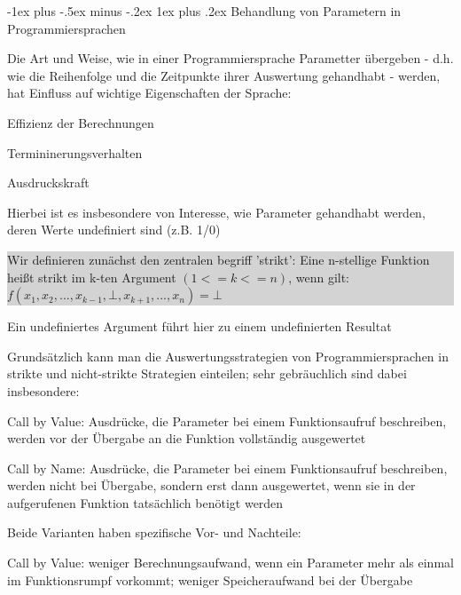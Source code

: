 \documentclass[10pt]{article}
\makeatletter
\renewcommand{\subsubsection}{\@startsection{subsubsection}{3}{0mm}%
                                {-1ex plus -.5ex minus -.2ex}%
                                {1ex plus .2ex}%
                                {\normalfont\small\bfseries}}
\makeatother
\begin{document}
\subsubsection{Behandlung von Parametern in Programmiersprachen}
\begin{itemize*}
  \item Die Art und Weise, wie in einer Programmiersprache Parametter übergeben - d.h. wie die Reihenfolge und die Zeitpunkte ihrer Auswertung gehandhabt - werden, hat Einfluss auf wichtige Eigenschaften der Sprache:
  \begin{itemize*}
    \item Effizienz der Berechnungen
    \item Termininerungsverhalten
    \item Ausdruckskraft
  \end{itemize*}
  \item Hierbei ist es insbesondere von Interesse, wie Parameter gehandhabt werden, deren Werte undefiniert sind (z.B. 1/0)\newline
  \colorbox{lightgray}{
    \begin{minipage}[h]{1.0\linewidth}
      Wir definieren zunächst den zentralen begriff 'strikt': \newline Eine n-stellige Funktion heißt strikt im k-ten Argument $(1<=k<=n)$, wenn gilt: $f(x_1,x_2,...,x_{k-1},\bot,x_{k+1},...,x_n)=\bot$
    \end{minipage}}
  \item Ein undefiniertes Argument führt hier zu einem undefinierten Resultat
  \item Grundsätzlich kann man die Auswertungsstrategien von Programmiersprachen in strikte und nicht-strikte Strategien einteilen; sehr gebräuchlich sind dabei insbesondere:
  \begin{itemize*}
    \item Call by Value: Ausdrücke, die Parameter bei einem Funktionsaufruf beschreiben, werden vor der Übergabe an die Funktion vollständig ausgewertet
    \item Call by Name: Ausdrücke, die Parameter bei einem Funktionsaufruf beschreiben, werden nicht bei Übergabe, sondern erst dann ausgewertet, wenn sie in der aufgerufenen Funktion tatsächlich benötigt werden
  \end{itemize*}
  \item Beide Varianten haben spezifische Vor- und Nachteile:
  \begin{itemize*}
    \item Call by Value: weniger Berechnungsaufwand, wenn ein Parameter mehr als einmal im Funktionsrumpf vorkommt; weniger Speicheraufwand bei der Übergabe

\end{itemize*}
\end{itemize*}
\end{document}

